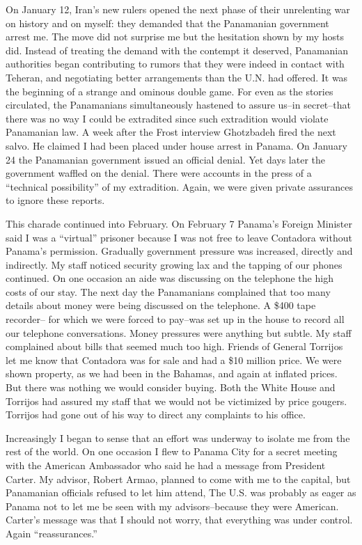 On January 12, Iran’s new rulers opened the next phase of their unrelenting war on history and on myself: they demanded that the Panamanian government arrest me. The move did not surprise me but the hesitation shown by my hosts did. Instead of treating the demand with the contempt it deserved, Panamanian authorities began contributing to rumors that they were indeed in contact with Teheran, and negotiating better arrangements than the U.N. had offered. It was the beginning of a strange and ominous double game. For even as the stories circulated, the Panamanians simultaneously hastened to assure us--in secret--that there was no way I could be extradited since such extradition would violate Panamanian law. A week after the Frost interview Ghotzbadeh fired the next salvo. He claimed I had been placed under house arrest in Panama. On January 24 the Panamanian government issued an official denial. Yet days later the government waffled on the denial. There were accounts in the press of a “technical possibility” of my extradition. Again, we were given private assurances to ignore these reports. 

This charade continued into February. On February 7 Panama's Foreign Minister said I was a “virtual” prisoner because I was not free to leave Contadora without Panama's permission. Gradually government pressure was increased, directly and indirectly. My staff noticed security growing lax and the tapping of our phones continued. On one occasion an aide was discussing on the telephone the high costs of our stay. The next day the Panamanians complained that too many details about money were being discussed on the telephone. A \$400 tape recorder-- for which we were forced to pay--was set up in the house to record all our telephone conversations. Money pressures were anything but subtle. My staff complained about bills that seemed much too high. Friends of General Torrijos let me know that Contadora was for sale and had a \$10 million price. We were shown property, as we had been in the Bahamas, and again at inflated prices. But there was nothing we would consider buying. Both the White House and Torrijos had assured my staff that we would not be victimized by price gougers. Torrijos had gone out of his way to direct any complaints to his office. 

Increasingly I began to sense that an effort was underway to isolate me from the rest of the world. On one occasion I flew to Panama City for a secret meeting with the American Ambassador who said he had a message from President Carter. My advisor, Robert Armao, planned to come with me to the capital, but Panamanian officials refused to let him attend, The U.S. was probably as eager as Panama not to let me be seen with my advisors--because they were American. Carter's message was that I should not worry, that everything was under control. Again “reassurances.” 

